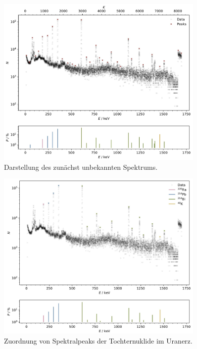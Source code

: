 \begin{figure}[H]
    \centering
    \includegraphics[width=0.9\textwidth]{content/plots/plot11.jpg}
    \caption{Darstellung des zunächst unbekannten Spektrums.}
    \label{fig:plot11}
\end{figure}

\begin{figure}[H]
    \centering
    \includegraphics[width=0.9\textwidth]{content/plots/plot12.jpg}
    \caption{Zuordnung von Spektralpeaks der Tochternuklide im Uranerz.}
    \label{fig:plot12}
\end{figure}
